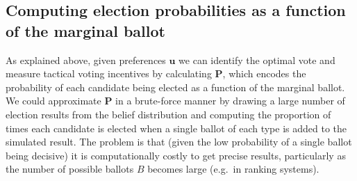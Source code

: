 \documentclass[11pt,a4paper]{article}
\begin{document}
\subsection{Computing election probabilities as a function of the marginal ballot}

As explained above, given preferences $\mathbf{u}$ we can  identify the optimal vote and measure tactical voting incentives by calculating $\mathbf{P}$, which encodes the probability of each candidate being elected as a function of the marginal ballot. We could approximate $\mathbf{P}$ in a brute-force manner by drawing a large number of election results from the belief distribution and computing the proportion of times each candidate is elected when a single ballot of each type is added to the simulated result. The problem is that (given the low probability of a single ballot being decisive) it is computationally costly to get precise results, particularly as the number of possible ballots $B$ becomes large (e.g.\ in ranking systems). 
\end{document}
